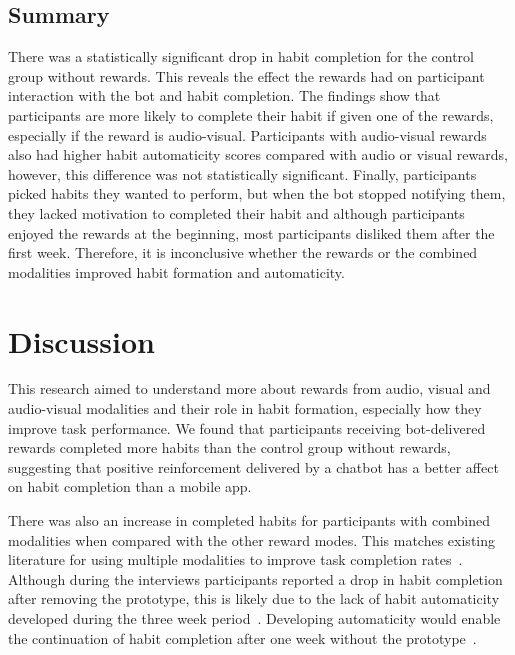\documentclass{scaffold/sigchi}
\begin{document}
\subsection{Summary}
There was a statistically significant drop in habit completion for the control group without rewards. This reveals the effect the rewards had on participant interaction with the bot and habit completion. The findings show that participants are more likely to complete their habit if given one of the rewards, especially if the reward is audio-visual. Participants with audio-visual rewards also had higher habit automaticity scores compared with audio or visual rewards, however, this difference was not statistically significant. Finally, participants picked habits they wanted to perform, but when the bot stopped notifying them, they lacked motivation to completed their habit and although participants enjoyed the rewards at the beginning, most participants disliked them after the first week. Therefore, it is inconclusive whether the rewards or the combined modalities improved habit formation and automaticity.

\section{Discussion}
This research aimed to understand more about rewards from audio, visual and audio-visual modalities and their role in habit formation, especially how they improve task performance. We found that participants receiving bot-delivered rewards completed more habits than the control group without rewards, suggesting that positive reinforcement delivered by a chatbot has a better affect on habit completion than a mobile app.

There was also an increase in completed habits for participants with combined modalities when compared with the other reward modes. This matches existing literature for using multiple modalities to improve task completion rates~\cite{comparing_modalities_effects_of_visual_auditory, benefits_of_audio_visual_1, benefits_of_audio_visual_2, when_do_we_interact_multimodally,oussama_tap_the_shapetones}. Although during the interviews participants reported a drop in habit completion after removing the prototype, this is likely due to the lack of habit automaticity developed during the three week period~\cite{article_dont_kick_habit, article_realtime_feedback_improving_medication_taking}. Developing automaticity would enable the continuation of habit completion after one week without the prototype~\cite{article_beyond_self_tracking_designing_apps}.
\end{document}
